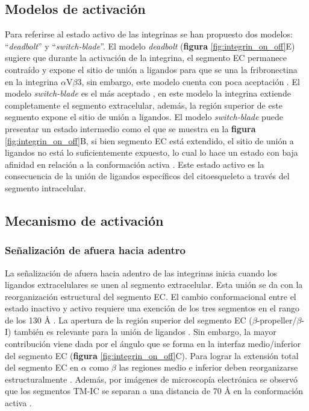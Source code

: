 \subsection{Modelos de activación}

Para referirse al estado activo de las integrinas se han propuesto dos modelos: ``\textit{deadbolt}'' y ``\textit{switch-blade}''. El modelo \textit{deadbolt} (\textbf{figura} \ref{fig:integrin_on_off}E) sugiere que durante la activación de la integrina, el segmento EC permanece contraído y expone el sitio de unión a ligandos para que se una la fribronectina en la integrina $\alpha$V$\beta$3, sin embargo, este modelo cuenta con poca aceptación \citep{Xiong2003, Xie2010,Zhu2008}. El modelo \textit{switch-blade} es el más aceptado \citep{Beglova2002, Hynes2002, Ye2008}, en este modelo la integrina extiende completamente el segmento extracelular, además, la región superior de este segmento expone el sitio de unión a ligandos. El modelo \textit{switch-blade} puede presentar un estado intermedio como el que se muestra en la \textbf{figura} \ref{fig:integrin_on_off}B, si bien segmento EC está extendido, el sitio de unión a ligandos no está lo suficientemente expuesto, lo cual lo hace un estado con baja afinidad en relación a la conformación activa \citep{Coutinho2007}. Este estado activo es la consecuencia de la unión de ligandos específicos del citoesqueleto a través del segmento intracelular.

\subsection{Mecanismo de activación}

\subsubsection{Señalización de afuera hacia adentro}

La señalización de afuera hacia adentro de las integrinas inicia cuando los ligandos extracelulares se unen al segmento extracelular. Esta unión se da con la reorganización estructural del segmento EC. El cambio conformacional entre el estado inactivo y activo requiere una exención de los tres segmentos en el rango de los 130 Å \citep{Li2018}. La apertura de la región superior del segmento EC ($\beta$-propeller/$\beta$-I) también es relevante para la unión de ligandos \citep{Takagi2002, Luo2003, Puklin-Faucher2006}. Sin embargo, la mayor contribución viene dada por el ángulo que se forma en la interfaz medio/inferior del segmento EC (\textbf{figura} \ref{fig:integrin_on_off}C). Para lograr la extensión total del segmento EC en $\alpha$ como $\beta$ las regiones medio e inferior deben reorganizarse estructuralmente \citep{Adair2005, Bennett2009, Bledzka2013, Xiong2004}. Además, por imágenes de microscopía electrónica se observó que los segmentos TM-IC se separan a una distancia de 70 Å en la conformación activa \citep{Adair2002, Litvinov2004, Springer2012}.

